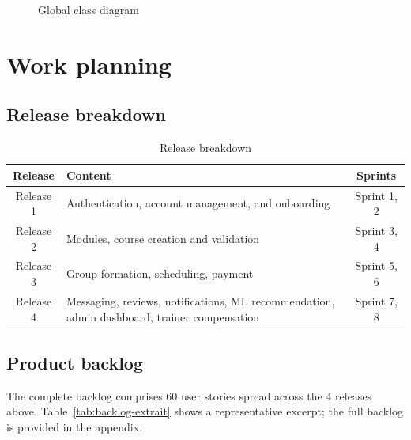 \documentclass[a4paper,12pt]{report}
\begin{document}
\begin{figure}[H]
\centering
\caption{Global class diagram}
\label{fig:class-global}
\end{figure}

\section{Work planning}

\subsection{Release breakdown}
\begin{table}[H]
\centering
\caption{Release breakdown}
\begin{tabular}{|c|P{7cm}|c|}
\hline
{}
\textbf{Release} & \textbf{Content} & \textbf{Sprints} \\
\hline
Release 1 & Authentication, account management, and onboarding & Sprint 1, 2 \\
\hline
Release 2 & Modules, course creation and validation & Sprint 3, 4 \\
\hline
Release 3 & Group formation, scheduling, payment & Sprint 5, 6 \\
\hline
Release 4 & Messaging, reviews, notifications, ML recommendation, admin dashboard, trainer compensation & Sprint 7, 8 \\
\hline
\end{tabular}
\end{table}

\subsection{Product backlog}
The complete backlog comprises 60 user stories spread across the 4
releases above. Table~\ref{tab:backlog-extrait} shows a representative
excerpt; the full backlog is provided in the appendix.
\end{document}
